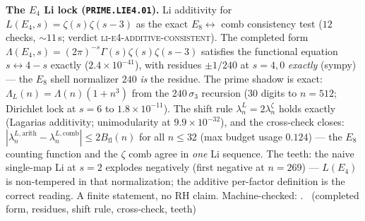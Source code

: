 \par\smallskip\noindent\textbf{The $E_4$ Li lock
(\texttt{PRIME.LIE4.01}).}
Li additivity for $L(E_4,s)=\zeta(s)\zeta(s-3)$ as the exact
$E_8\leftrightarrow$ comb consistency test ($12$ checks,
${\sim}11$\,s; verdict \textsc{li-e4-additive-consistent}).  The
completed form
$\Lambda(E_4,s)=(2\pi)^{-s}\Gamma(s)\zeta(s)\zeta(s-3)$ satisfies
the functional equation $s\leftrightarrow4-s$ exactly
($2.4\times10^{-41}$), with residues $\pm1/240$ at $s=4,0$
\emph{exactly} (sympy) --- the $E_8$ shell normalizer $240$
\emph{is} the residue.  The prime shadow is exact:
$\Lambda_L(n)=\Lambda(n)(1+n^3)$ from the $240\,\sigma_3$ recursion
($30$ digits to $n=512$; Dirichlet lock at $s=6$ to
$1.8\times10^{-11}$).  The shift rule
$\lambda_n^L=2\lambda_n^\zeta$ holds exactly (Lagarias additivity;
unimodularity at $9.9\times10^{-32}$), and the cross-check closes:
$|\lambda_n^{L,\mathrm{arith}}-\lambda_n^{L,\mathrm{comb}}|
\le2B_{\mathrm{fl}}(n)$ for all $n\le32$ (max budget usage $0.124$)
--- the $E_8$ counting function and the $\zeta$ comb agree in
\emph{one} Li sequence.  The teeth: the naive single-map Li at $s=2$
explodes negatively (first negative at $n=269$) --- $L(E_4)$ is
non-tempered in that normalization; the additive per-factor
definition is the correct reading.  A finite statement, no RH claim.
Machine-checked: .
\mE\ (completed form, residues, shift rule, cross-check, teeth)
\par\smallskip


